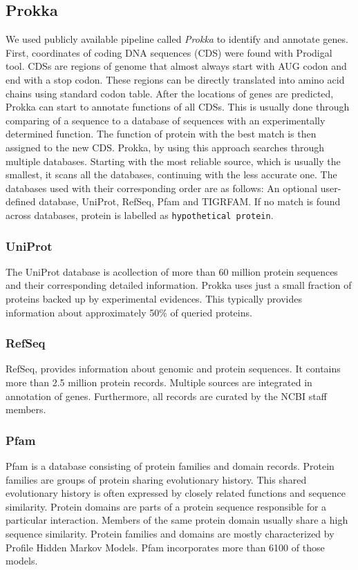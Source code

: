 \subsection{Prokka}
We used publicly available pipeline called \emph{Prokka} \cite{prokka} to identify and annotate genes.
First, coordinates of coding DNA sequences (CDS) were found with Prodigal tool\cite{prodigal}.
CDSs are regions of genome that almost always start with AUG codon and end with a stop codon.
These regions can be directly translated into amino acid chains using standard codon table.
After the locations of genes are predicted, Prokka can start to annotate functions of all CDSs.
This is usually done through comparing of a sequence to a database of sequences with an experimentally determined function.
The function of protein with the best match is then assigned to the new CDS.
Prokka, by using this approach searches through multiple databases.
Starting with the most reliable source, which is usually the smallest, it scans all the databases, continuing with the less accurate one.
The databases used with their corresponding order are as follows:
An optional user-defined database, UniProt\cite{uniprot}, RefSeq\cite{refseq}, Pfam\cite{pfam} and TIGRFAM\cite{tigrfam}.
If no match is found across databases, protein is labelled as \verb|hypothetical protein|.


\subsubsection{UniProt}
The UniProt database is acollection of more than 60 million protein sequences and their corresponding detailed information.
Prokka uses just a small fraction of proteins backed up by experimental evidences.
This typically provides information about approximately 50\% of queried proteins.

\subsubsection{RefSeq}
RefSeq, provides information about genomic and protein sequences.
It contains more than 2.5 million protein records.
Multiple sources are integrated in annotation of genes.
Furthermore, all records are curated by the NCBI staff members.

\subsubsection{Pfam}
Pfam is a database consisting of protein families and domain records.
Protein families are groups of protein sharing evolutionary history.
This shared evolutionary history is often expressed by closely related functions and sequence similarity.
Protein domains are parts of a protein sequence responsible for a particular interaction. 
Members of the same protein domain usually share a high sequence similarity.
Protein families and domains are mostly characterized by Profile Hidden Markov Models.
Pfam incorporates more than 6100 of those models.

